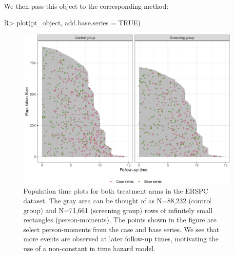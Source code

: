 \documentclass[
]{jss}
\begin{document}
We then pass this object to the corresponding  method:

\begin{CodeChunk}

\begin{CodeInput}
R> plot(pt_object, add.base.series = TRUE)
\end{CodeInput}
\end{CodeChunk}

\begin{CodeChunk}
\begin{figure}[ht]

{\centering \includegraphics[width=\textwidth,keepaspectratio=true]{../figures/plot-stratified-erspc-data-1} 

}

\caption[Population time plots for both treatment arms in the ERSPC dataset]{Population time plots for both treatment arms in the ERSPC dataset. The gray area can be thought of as N=88,232 (control group) and N=71,661 (screening group) rows of infinitely small rectangles (person-moments). The points shown in the figure are select person-moments from the case and base series. We see that more events are observed at later follow-up times, motivating the use of a non-constant in time hazard model.}\label{fig:plot-stratified-erspc-data}
\end{figure}
\end{CodeChunk}
\end{document}
